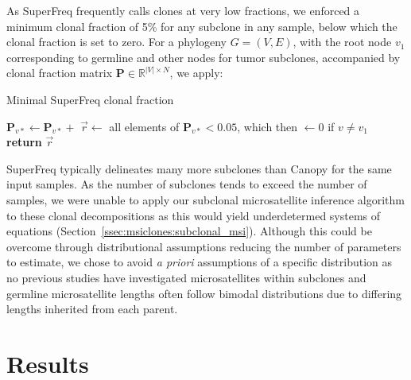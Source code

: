 As SuperFreq frequently calls clones at very low fractions, we enforced a minimum clonal fraction of 5\% for any subclone in any sample, below which the clonal fraction is set to zero. For a phylogeny $G = (V, E)$, with the root node $v_1$ corresponding to germline and other nodes for tumor subclones, accompanied by clonal fraction matrix $\mathbf{P} \in \mathbb{R}^{|V| \times N}$, we apply:
\begin{algorithm}[H]
	\caption{Minimal SuperFreq clonal fraction}
	\label{alg:msiclones:min-clonal-frac}
	\begin{algorithmic}[1]
				\State $\mathbf{P}_{v*} \gets \mathbf{P}_{v*} +$ 
			\EndFor
			\State $\vec{r} \gets$ all elements of $\mathbf{P}_{v*} < 0.05$, which then $\gets 0$ if $v \neq v_1$
			\State \textbf{return} $\vec{r}$
		\EndProcedure
		\State {}
	\end{algorithmic}
\end{algorithm}

SuperFreq typically delineates many more subclones than Canopy for the same input samples. As the number of subclones tends to exceed the number of samples, we were unable to apply our subclonal microsatellite inference algorithm to these clonal decompositions as this would yield underdetermed systems of equations (Section~\ref{ssec:msiclones:subclonal_msi}). Although this could be overcome through distributional assumptions reducing the number of parameters to estimate, we chose to avoid \textit{a priori} assumptions of a specific distribution as no previous studies have investigated microsatellites within subclones and germline microsatellite lengths often follow bimodal distributions due to differing lengths inherited from each parent.

\section{Results}
